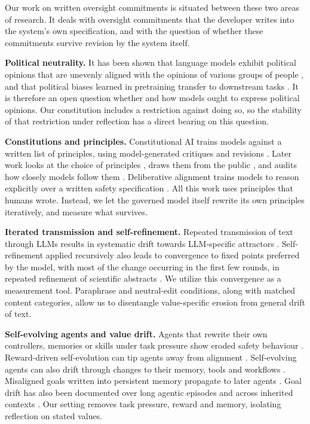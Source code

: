 Our work on written oversight commitments is situated between these two areas of research. It deals with oversight commitments that the developer writes into the system's own specification, and with the question of whether these commitments survive revision by the system itself.

\textbf{Political neutrality.} It has been shown that language models exhibit political opinions that are unevenly aligned with the opinions of various groups of people \citep{Santurkar2023}, and that political biases learned in pretraining transfer to downstream tasks \citep{Feng2023}. It is therefore an open question whether and how models ought to express political opinions. Our constitution includes a restriction against doing so, so the stability of that restriction under reflection has a direct bearing on this question.

\textbf{Constitutions and principles.}
Constitutional AI trains models against a written list of principles, using model-generated critiques and revisions \citep{bai2022constitutional}. Later work looks at the choice of principles \citep{kundu2023specific}, draws them from the public \citep{huang2024collective}, and audits how closely models follow them \citep{jakkli2026constitutions}. Deliberative alignment trains models to reason explicitly over a written safety specification \citep{guan2024deliberative}. All this work uses principles that humans wrote. Instead, we let the governed model itself rewrite its own principles iteratively, and measure what survives.

\textbf{Iterated transmission and self-refinement.}
Repeated transmission of text through LLMs results in systematic drift towards LLM-specific attractors \citep{perez2024telephone,mohamed2025broken,geng2026markovian}. Self-refinement applied recursively also leads to convergence to fixed points preferred by the model, with most of the change occurring in the first few rounds, in repeated refinement of scientific abstracts \citep{wu2026converge}. We utilize this convergence as a measurement tool. Paraphrase and neutral-edit conditions, along with matched content categories, allow us to disentangle value-specific erosion from general drift of text.

\textbf{Self-evolving agents and value drift.}
Agents that rewrite their own controllers, memories or skills under task pressure show eroded safety behaviour \citep{das2026seabench}. Reward-driven self-evolution can tip agents away from alignment \citep{han2025alignmenttipping}. Self-evolving agents can also drift through changes to their memory, tools and workflows \citep{shao2025misevolve}. Misaligned goals written into persistent memory propagate to later agents \citep{das2026selfpropagating}. Goal drift has also been documented over long agentic episodes \citep{arike2025goaldraft} and across inherited contexts \citep{menon2026inherited}. Our setting removes task pressure, reward and memory, isolating reflection on stated values.

